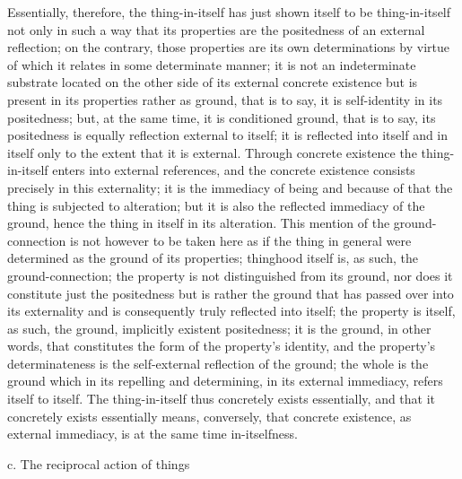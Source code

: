 Essentially, therefore, the thing-in-itself has just shown itself
to be thing-in-itself not only in such a way that its properties are
the positedness of an external reflection;
on the contrary, those properties are its own determinations
by virtue of which it relates in some determinate manner;
it is not an indeterminate substrate located on
the other side of its external concrete existence
but is present in its properties rather as ground,
that is to say, it is self-identity in its positedness;
but, at the same time, it is conditioned ground, that is to say,
its positedness is equally reflection external to itself;
it is reflected into itself and in itself only to 
the extent that it is external.
Through concrete existence the thing-in-itself
enters into external references, 
and the concrete existence consists
precisely in this externality;
it is the immediacy of being
and because of that the thing is
subjected to alteration;
but it is also the reflected immediacy of the ground,
hence the thing in itself in its alteration.
This mention of the ground-connection is
not however to be taken here as if 
the thing in general were determined 
as the ground of its properties;
thinghood itself is, as such, the ground-connection;
the property is not distinguished from its ground,
nor does it constitute just the positedness
but is rather the ground that has
passed over into its externality
and is consequently truly reflected into itself;
the property is itself, as such, 
the ground, implicitly existent positedness;
it is the ground, in other words,
that constitutes the form of the property's identity,
and the property's determinateness is 
the self-external reflection of the ground;
the whole is the ground which in its repelling and determining,
in its external immediacy, refers itself to itself.
The thing-in-itself thus concretely exists essentially,
and that it concretely exists essentially means,
conversely, that concrete existence, as external immediacy,
is at the same time in-itselfness.

c. The reciprocal action of things

